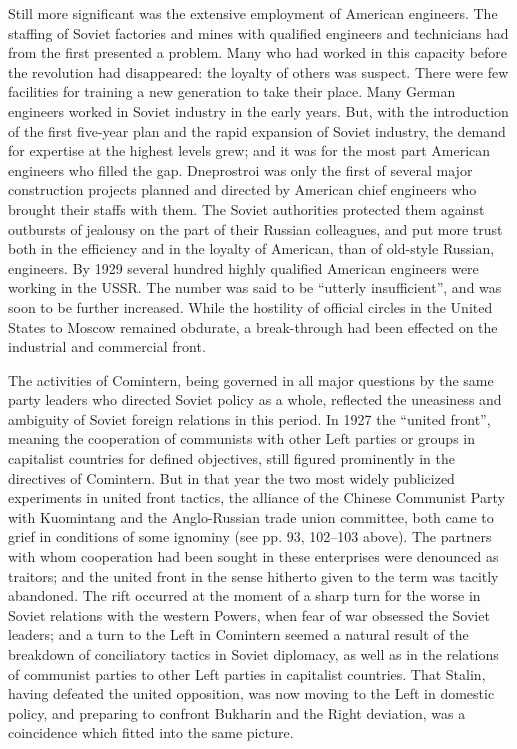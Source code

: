 Still more significant was the extensive employment of American engineers. The staffing of Soviet factories and mines with qualified engineers and technicians had from the first presented a problem. Many who had worked in this capacity before the revolution had disappeared: the loyalty of others was suspect. There were few facilities for training a new generation to take their place. Many German engineers worked in Soviet industry in the early years. But, with the introduction of the first five-year plan and the rapid expansion of Soviet industry, the demand for expertise at the highest levels grew; and it was for the most part American engineers who filled the gap. Dneprostroi was only the first of several major construction projects planned and directed by American chief engineers who brought their staffs with them. The Soviet authorities protected them against outbursts of jealousy on the part of their Russian colleagues, and put more trust both in the efficiency and in the loyalty of American, than of old-style Russian, engineers. By 1929 several hundred highly qualified American engineers were working in the USSR. The number was said to be ``utterly insufficient'', and was soon to be further increased. While the hostility of official circles in the United States to Moscow remained obdurate, a break-through had been effected on the industrial and commercial front. 

The activities of Comintern, being governed in all major questions by the same party leaders who directed Soviet policy as a whole, reflected the uneasiness and ambiguity of Soviet foreign relations in this period. In 1927 the ``united front'', meaning the cooperation of communists with other Left parties or groups in capitalist countries for defined objectives, still figured prominently in the directives of Comintern. But in that year the two most widely publicized experiments in united front tactics, the alliance of the Chinese Communist Party with Kuomintang and the Anglo-Russian trade union committee, both came to grief in conditions of some ignominy (see pp. 93, 102--103 above). The partners with whom cooperation had been sought in these enterprises were denounced as traitors; and the united front in the sense hitherto given to the term was tacitly abandoned. The rift occurred at the moment of a sharp turn for the worse in Soviet relations with the western Powers, when fear of war obsessed the Soviet leaders; and a turn to the Left in Comintern seemed a natural result of the breakdown of conciliatory tactics in Soviet diplomacy, as well as in the relations of communist parties to other Left parties in capitalist countries. That Stalin, having defeated the united opposition, was now moving to the Left in domestic policy, and preparing to confront Bukharin and the Right deviation, was a coincidence which fitted into the same picture. 

